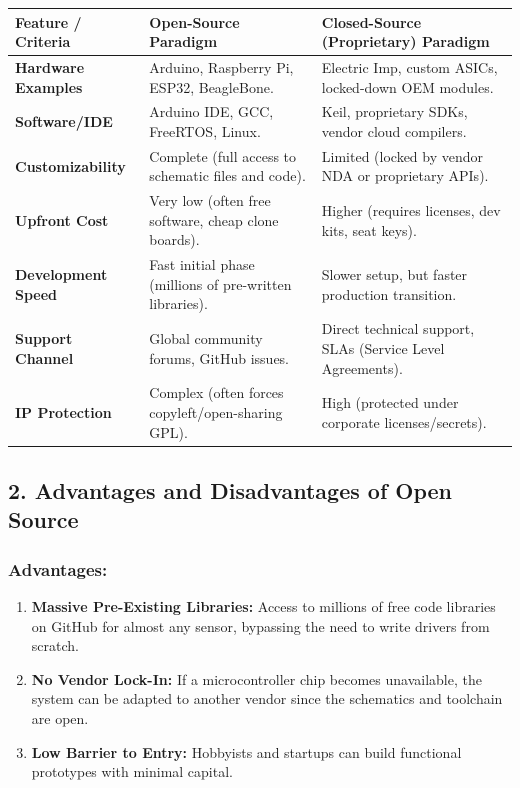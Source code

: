\begin{table}[H]
\centering
\begin{tabular}{|p{}|p{}|p{}|}
\hline
Feature / Criteria & Open-Source Paradigm & Closed-Source (Proprietary) Paradigm \\
\hline
\textbf{Hardware Examples} & Arduino, Raspberry Pi, ESP32, BeagleBone. & Electric Imp, custom ASICs, locked-down OEM modules. \\
\hline
\textbf{Software/IDE} & Arduino IDE, GCC, FreeRTOS, Linux. & Keil, proprietary SDKs, vendor cloud compilers. \\
\hline
\textbf{Customizability} & Complete (full access to schematic files and code). & Limited (locked by vendor NDA or proprietary APIs). \\
\hline
\textbf{Upfront Cost} & Very low (often free software, cheap clone boards). & Higher (requires licenses, dev kits, seat keys). \\
\hline
\textbf{Development Speed} & Fast initial phase (millions of pre-written libraries). & Slower setup, but faster production transition. \\
\hline
\textbf{Support Channel} & Global community forums, GitHub issues. & Direct technical support, SLAs (Service Level Agreements). \\
\hline
\textbf{IP Protection} & Complex (often forces copyleft/open-sharing GPL). & High (protected under corporate licenses/secrets). \\
\hline
\end{tabular}
\end{table}


\subsection{2. Advantages and Disadvantages of Open Source}

\subsubsection{Advantages:}
\begin{enumerate}
  \item \textbf{Massive Pre-Existing Libraries:} Access to millions of free code libraries on GitHub for almost any sensor, bypassing the need to write drivers from scratch.
  \item \textbf{No Vendor Lock-In:} If a microcontroller chip becomes unavailable, the system can be adapted to another vendor since the schematics and toolchain are open.
  \item \textbf{Low Barrier to Entry:} Hobbyists and startups can build functional prototypes with minimal capital.
\end{enumerate}

